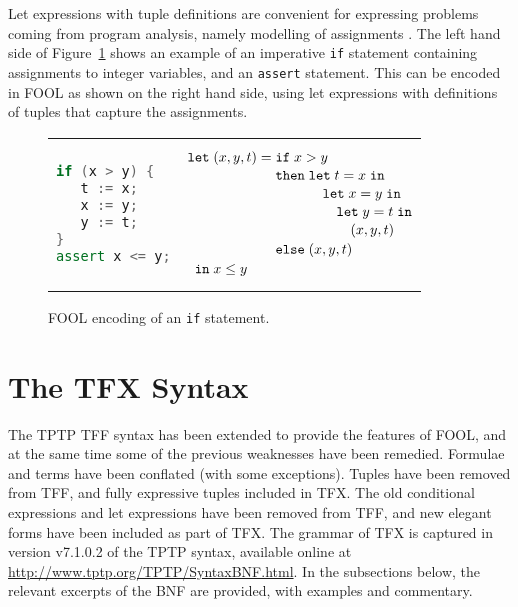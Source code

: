 Let expressions with tuple definitions are convenient for expressing 
problems coming from program analysis, namely modelling of assignments
\cite{KKV18}.
The left hand side of Figure~\ref{fig:tfx/simple-if} shows an example of an 
imperative \texttt{if} statement containing assignments to integer variables, 
and an \texttt{assert} statement. 
This can be encoded in FOOL as shown on the right hand side, using 
let expressions with definitions of tuples that capture the assignments.

\begin{figure}[htbp]
\begin{center}
\begin{tabular}[t]{ll}
\begin{minipage}{0.245\textwidth}
\vspace{0.8cm}
\begin{lstlisting}[language=cpp]
if (x > y) {
   t := x;
   x := y;
   y := t;
}
assert x <= y;
\end{lstlisting}
\end{minipage}
&\hspace{0.4cm}
\begin{minipage}{0.5\textwidth}
\[
  \letnl{(x,y,t)}{\itenll{x > y}
                 {\letinnl{t}{x}
                          {\letinnl{x}{y}
                                   {\letinnl{y}{t}
                                            {(x,y,t)}}}}
                 {(x,y,t)}}
        {x \le y}
\]
\end{minipage}
\\
\end{tabular}
\end{center}
\caption{FOOL encoding of an {\tt if} statement.}
\label{fig:tfx/simple-if}
\end{figure}

\section{The TFX Syntax}
\label{sec:tfx/TFX}

The TPTP TFF syntax has been extended to provide the features of FOOL,
and at the same time some of the previous weaknesses have been remedied.
Formulae and terms have been conflated (with some exceptions).
Tuples have been removed from TFF, and fully expressive tuples included in 
TFX. 
The old conditional expressions and let expressions have been removed from 
TFF, and new elegant forms have been included as part of TFX. 
The grammar of TFX is captured in version v7.1.0.2 of the TPTP syntax,
available online at \url{http://www.tptp.org/TPTP/SyntaxBNF.html}.
In the subsections below, the relevant excerpts of the BNF are provided,
with examples and commentary.

